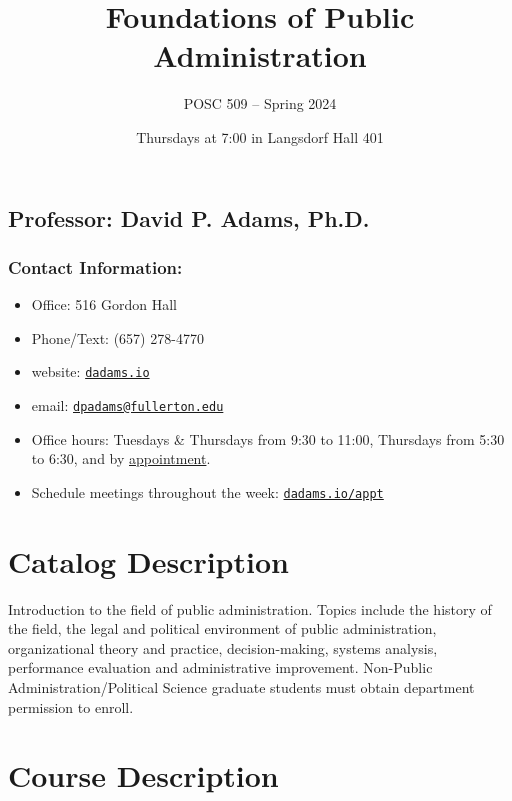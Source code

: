 \documentclass[10pt, letterpaper]{article}
\begin{document}
    \title{Foundations of Public Administration}
    
    \author{POSC 509 -- Spring 2024}
    \date{Thursdays at 7:00 in Langsdorf Hall 401}
    
        \maketitle

\subsection*{Professor: David P. Adams, Ph.D.}

\subsubsection*{Contact Information:}

\begin{itemize}
	\item Office: 516 Gordon Hall
	\item Phone/Text: (657) 278-4770
	\item website: \href{https://dadams.io}{\texttt{dadams.io}}
	\item email: \href{dpadams@fullerton.edu}{\texttt{dpadams@fullerton.edu}}
	\item Office hours: Tuesdays \& Thursdays from 9:30 to 11:00, Thursdays from 5:30 to 6:30, and by \href{https://dadams.io/appt}{appointment}.
	\item Schedule meetings throughout the week: \href{https://dadams.io/appt}{\texttt{dadams.io/appt}}
\end{itemize}

\section*{Catalog Description}

Introduction to the field of public administration. Topics include the history of the field, the legal and political environment of public administration, organizational theory and practice, decision-making, systems analysis, performance evaluation and administrative improvement. Non-Public Administration/Political Science graduate students must obtain department permission to enroll.

\section*{Course Description}
\end{document}
